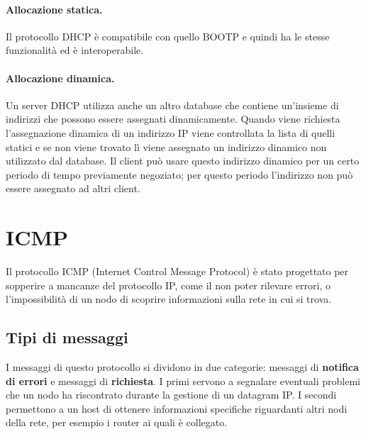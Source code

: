             \paragraph{Allocazione statica.} Il protocollo DHCP è compatibile con quello BOOTP e quindi ha le stesse funzionalità ed è interoperabile.
            
            \paragraph{Allocazione dinamica.} Un server DHCP utilizza anche un altro database che contiene un'insieme di indirizzi che possono essere assegnati dinamicamente. Quando viene richiesta l'assegnazione dinamica di un indirizzo IP viene controllata la lista di quelli statici e se non viene trovato lì viene assegnato un indirizzo dinamico non utilizzato dal database. Il client può usare questo indirizzo dinamico per un certo periodo di tempo previamente negoziato; per questo periodo l'indirizzo non può essere assegnato ad altri client.
    
\section{ICMP}
    Il protocollo ICMP (Internet Control Message Protocol) è stato progettato per sopperire a mancanze del protocollo IP, come il non poter rilevare errori, o l'impossibilità di un nodo di scoprire informazioni sulla rete in cui si trova.
    
    \subsection{Tipi di messaggi}
        I messaggi di questo protocollo si dividono in due categorie: messaggi di \textbf{notifica di errori} e messaggi di \textbf{richiesta}. I primi servono a segnalare eventuali problemi che un nodo ha riscontrato durante la gestione di un datagram IP. I secondi permettono a un host di ottenere informazioni specifiche riguardanti altri nodi della rete, per esempio i router ai quali è collegato.
        

